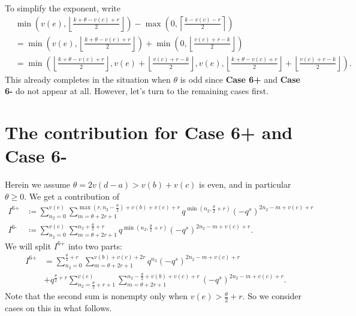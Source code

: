 To simplify the exponent, write
\begin{equation}
  \begin{aligned}
    &\min\left( v(e), \left\lfloor \tfrac{k+\theta-v(c)+r}{2} \right\rfloor \right)
    - \max\left( 0, \left\lceil \tfrac{k-v(c)-r}{2} \right\rceil \right) \\
    &= \min\left( v(e), \left\lfloor \tfrac{k+\theta-v(c)+r}{2} \right\rfloor \right)
    + \min\left( 0, \left\lfloor \tfrac{v(c)+r-k}{2} \right\rfloor \right) \\
    &= \min\left( \left\lfloor \tfrac{k+\theta-v(c)+r}{2} \right\rfloor,
      v(e) + \left\lfloor \tfrac{v(c)+r-k}{2} \right\rfloor,
      v(e),
      \left\lfloor \tfrac{k+\theta-v(c)+r}{2} \right\rfloor
      + \left\lfloor \tfrac{v(c)+r-k}{2} \right\rfloor \right).
  \end{aligned}
  \label{eq:case_5_exponent}
\end{equation}
This already completes 
in the situation when $\theta$ is odd since
\textbf{Case 6\ts+} and \textbf{Case 6\ts-} do not appear at all.
However, let's turn to the remaining cases first.

\section{The contribution for Case 6\ts+ and Case 6\ts-}
Herein we assume $\theta = 2v(d-a) > v(b) + v(c)$ is even,
and in particular $\theta \ge 0$.
We get a contribution of
\begin{align*}
  I^{\text{6+}}
  &\coloneqq \sum_{n_2 = 0}^{v(e)}
  \sum_{m = \theta + 2r + 1}
  ^{\max\left( r, n_2 - \frac{\theta}{2} \right) + v(b) + v(c) + r}
    q^{\min\left( n_2, \frac{\theta}{2} + r \right)}
    (-q^s)^{2n_2 - m + v(c) + r} \\
  I^{\text{6-}}
  &\coloneqq \sum_{n_2 = 0}^{v(e)}
  \sum_{m = \theta + 2r + 1}^{n_2 + \frac{\theta}{2} + r}
    q^{\min\left( n_2, \frac{\theta}{2} + r \right)}
    (-q^s)^{2n_2 - m + v(c) + r}.
\end{align*}
We will split $I^{\text{6+}}$ into two parts:
\begin{align*}
  I^{\text{6+}}
  &= \sum_{n_2 = 0}^{\frac{\theta}{2} + r}
  \sum_{m = \theta + 2r + 1}^{v(b) + v(c) + 2r}
    q^{n_2} (-q^s)^{2n_2 - m + v(c) + r} \\
  &+ q^{\frac{\theta}{2} + r} \sum_{n_2 = \frac{\theta}{2} + r + 1}^{v(e)}
  \sum_{m = \theta + 2r + 1}^{n_2 - \frac{\theta}{2} + v(b) + v(c) + r}
    (-q^s)^{2n_2 - m + v(c) + r}.
\end{align*}
Note that the second sum is nonempty only when $v(e) > \frac{\theta}{2} + r$.
So we consider cases on this in what follows.

